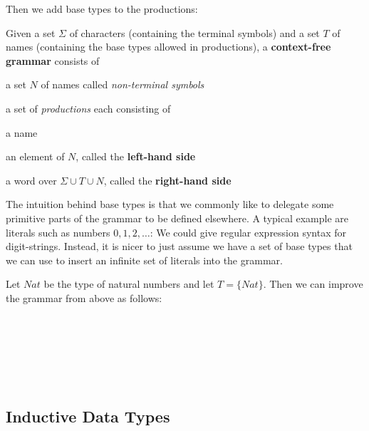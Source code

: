 Then we add base types to the productions:

\begin{definition}
Given a set $\Sigma$ of characters (containing the terminal symbols) and a set $T$ of names (containing the base types allowed in productions), a \textbf{context-free grammar} consists of
\begin{compactitem}
\item a set $N$ of names called \emph{non-terminal symbols}
\item a set of \emph{productions} each consisting of
 \begin{compactitem}
  \item a name
  \item an element of $N$, called the \textbf{left-hand side}
  \item a word over $\Sigma\cup T\cup N$, called the \textbf{right-hand side}
 \end{compactitem}
\end{compactitem}
\end{definition}

The intuition behind base types is that we commonly like to delegate some primitive parts of the grammar to be defined elsewhere.
A typical example are literals such as numbers $0, 1, 2,\ldots$: We could give regular expression syntax for digit-strings.
Instead, it is nicer to just assume we have a set of base types that we can use to insert an infinite set of literals into the grammar.

\begin{example}
Let $Nat$ be the type of natural numbers and let $T=\{Nat\}$.
Then we can improve the grammar from above as follows:
\begin{commgrammar}
\\
\\
\\
\\
\\
\end{commgrammar}
\end{example}

\subsection{Inductive Data Types}

